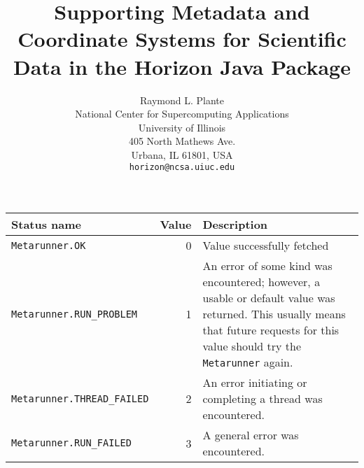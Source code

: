 \documentclass[12pt]{article}
\title{Supporting Metadata and Coordinate Systems for Scientific Data 
 	in the Horizon Java Package}
\author{Raymond L. Plante \\ 
	National Center for Supercomputing Applications\\ 
	University of Illinois\\ 
	405 North Mathews Ave.\\ 
	Urbana, IL 61801, USA\\ 
	{\tt horizon@ncsa.uiuc.edu}}
\begin{document}
\pagestyle{empty}
{\newpage\clearpage\samepage
\begin{table}\label{T:mrstat}

\begin{tabular}{|lrp{}|}
\hline
Status name                      & Value & Description   \\  \hline
\mbox{\tt Metarunner.OK}             & 0     & Value successfully fetched \\ 
 			     
\mbox{\tt Metarunner.RUN\_PROBLEM}   & 1     & An error of some kind was 
                                          encountered; however, a usable or 
                                          default value was returned.  This 
                                          usually means that future requests 
                                          for this value should try the
                                          \mbox{\tt Metarunner} again.  \\ 
 			     
\mbox{\tt Metarunner.THREAD\_FAILED} & 2     & An error initiating or completing a
                                          thread was encountered. \\ 
 
\mbox{\tt Metarunner.RUN\_FAILED}    & 3     & A general error was encountered. \\  
\hline
\end{tabular}
\end{table}}\hbox{}\vfil
\end{document}
